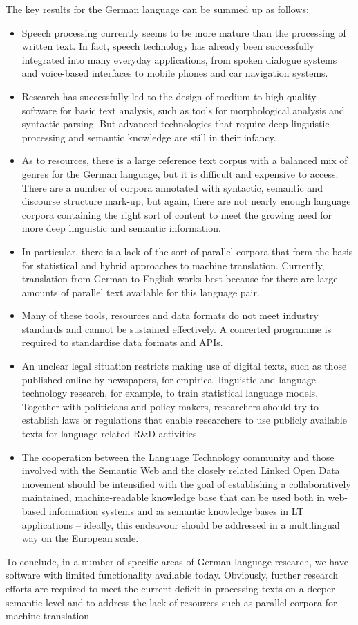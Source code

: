 \documentclass[]{../metanetpaper}
\begin{document}
\begin{Parallel}[c]{80mm}{80mm}
{    The key results for the German language can be summed up as follows:
    \begin{itemize}
      \item Speech processing currently seems to be more mature than the processing of written text. In fact, speech technology has already been successfully integrated into many everyday applications, from spoken dialogue systems and voice-based interfaces to mobile phones and car navigation systems. 
      \item Research has successfully led to the design of medium to high quality software for basic text analysis, such as tools for morphological analysis and syntactic parsing. But advanced technologies that require deep linguistic processing and semantic knowledge are still in their infancy. 
      \item As to resources, there is a large reference text corpus with a balanced mix of genres for the German language, but it is difficult and expensive to access. There are a number of corpora annotated with syntactic, semantic and discourse structure mark-up, but again, there are not nearly enough language corpora containing the right sort of content to meet the growing need for more deep linguistic and semantic information. 
      \item In particular, there is a lack of the sort of parallel corpora that form the basis for statistical and hybrid approaches to machine translation. Currently, translation from German to English works best because for there are large amounts of parallel text available for this language pair. 
      \item Many of these tools, resources and data formats do not meet industry standards and cannot be sustained effectively. A concerted programme is required to standardise data formats and APIs.
      \item An unclear legal situation restricts making use of digital texts, such as those published online by newspapers, for empirical linguistic and language technology research, for example, to train statistical language models. Together with politicians and policy makers, researchers should try to establish laws or regulations that enable researchers to use publicly available texts for language-related R\&D activities.
      \item The cooperation between the Language Technology community and those involved with the Semantic Web and the closely related Linked Open Data movement should be intensified with the goal of establishing a collaboratively maintained, machine-readable knowledge base that can be used both in web-based information systems and as semantic knowledge bases in LT applications – ideally, this endeavour should be addressed in a multilingual way on the European scale.
    \end{itemize}
    To conclude, in a number of specific areas of German language research, we have software with limited functionality available today. Obviously, further research efforts are required to meet the current deficit in processing texts on a deeper semantic level and to address the lack of resources such as parallel corpora for machine translation
  }
  

\end{Parallel}
\end{document}
